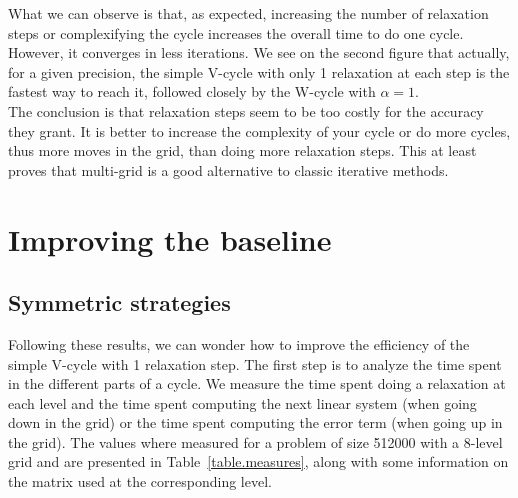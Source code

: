 \documentclass[a4paper,10pt]{article}
\begin{document}
What we can observe is that, as expected, increasing the number of relaxation steps or complexifying the cycle increases the overall time to do one cycle. However, it converges in less iterations.
We see on the second figure that actually, for a given precision, the simple V-cycle with only 1 relaxation at each step is the fastest way to reach it, followed closely by the W-cycle with $\alpha=1$.\\
The conclusion is that relaxation steps seem to be too costly for the accuracy they grant. It is better to increase the complexity of your cycle or do more cycles, thus more moves in the grid, than doing more relaxation steps. This at least proves
that multi-grid is a good alternative to classic iterative methods.

\section{Improving the baseline}

\subsection{Symmetric strategies}
Following these results, we can wonder how to improve the efficiency of the simple V-cycle with 1 relaxation step.
The first step is to analyze the time spent in the different parts of a cycle. We measure the time spent doing a relaxation at each level and the time spent computing the next linear system
(when going down in the grid) or the time spent computing the error term (when going up in the grid). The values where measured for a problem of size 512000 with a 8-level grid and are presented
in Table~\ref{table.measures}, along with some information on the matrix used at the corresponding level.
\end{document}

